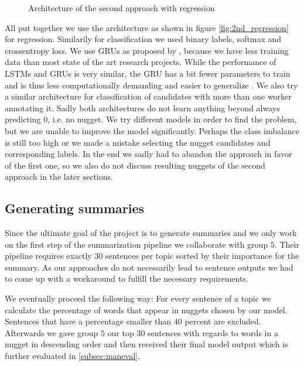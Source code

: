 \documentclass{article}
\begin{document}
\begin{figure}
\caption{Architecture of the second approach with regression}
\end{figure}

All put together we use the architecture as shown in figure \ref{fig:2nd_regression} for regression. Similarily for classification we used binary labels, softmax and crossentropy loss.
We use GRUs as proposed by \cite{gru2014}, because we have less training data than most state of the art research projects. While the performance of LSTMs and GRUs is very similar, the GRU has a bit fewer parameters to train and is thus less computationally demanding and easier to generalize \cite{cnn_rnn_comparative2017}. We also try a similar architecture for classification of candidates with more than one worker annotating it. Sadly both architectures do not learn anything beyond always predicting 0, i.e. no nugget. We try different models in order to find the problem, but we are unable to improve the model significantly. Perhaps the class imbalance is still too high or we made a mistake selecting the nugget candidates and corresponding labels. In the end we sadly had to abandon the approach in favor of the first one, so we also do not discuss resulting nuggets of the second approach in the later sections.

\subsection{Generating summaries}
Since the ultimate goal of the project is to generate summaries and we only work on the first step of the summarization pipeline we collaborate with group $5$. Their pipeline requires exactly 30 sentences per topic sorted by their importance for the summary. As our approaches do not necessarily lead to sentence outputs we had to come up with a workaround to fulfill the necessary requirements.  

We eventually proceed the following way: For every sentence of a topic we calculate the percentage of words that appear in nuggets chosen by our model. Sentences that have a percentage smaller than $40$ percent are excluded. Afterwards we gave group $5$ our top $30$ sentences with regards to words in a nugget in descending order and then received their final model output which is further evaluated in \ref{subsec:maneval}.   
\end{document}
